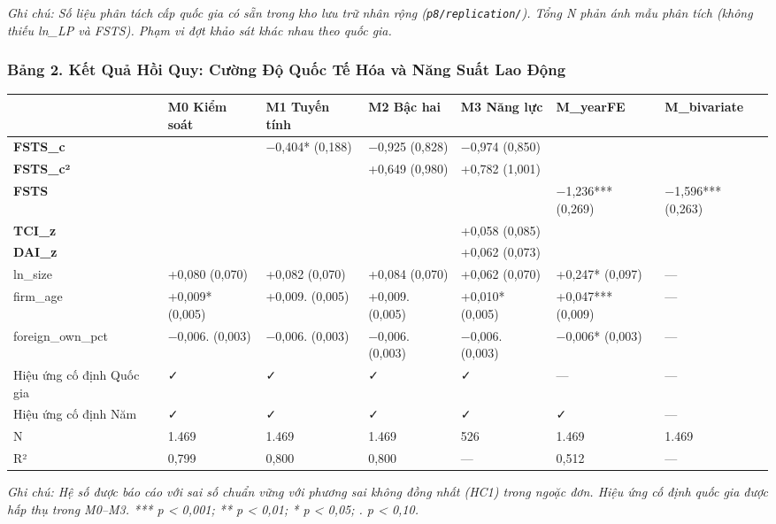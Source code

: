 \documentclass[12pt,a4paper]{article}
\begin{document}
\emph{Ghi chú: Số liệu phân tách cấp quốc gia có sẵn trong kho lưu trữ
nhân rộng (\texttt{p8/replication/}). Tổng N phản ánh mẫu phân tích
(không thiếu ln\_LP và FSTS). Phạm vi đợt khảo sát khác nhau theo quốc
gia.}

\hypertarget{bux1ea3ng-2-kux1ebft-quux1ea3-hux1ed3i-quy-cux1b0ux1eddng-ux111ux1ed9-quux1ed1c-tux1ebf-huxf3a-vuxe0-nux103ng-suux1ea5t-lao-ux111ux1ed9ng}{%
\subsubsection{Bảng 2. Kết Quả Hồi Quy: Cường Độ Quốc Tế Hóa và Năng
Suất Lao
Động}\label{bux1ea3ng-2-kux1ebft-quux1ea3-hux1ed3i-quy-cux1b0ux1eddng-ux111ux1ed9-quux1ed1c-tux1ebf-huxf3a-vuxe0-nux103ng-suux1ea5t-lao-ux111ux1ed9ng}}

\begin{longtable}[]{@{}lllllll@{}}
\toprule\noalign{}
& M0 Kiểm soát & M1 Tuyến tính & M2 Bậc hai & M3 Năng lực & M\_yearFE &
M\_bivariate \\
\midrule\noalign{}
\endhead
\bottomrule\noalign{}
\endlastfoot
\textbf{FSTS\_c} & & −0,404* (0,188) & −0,925 (0,828) & −0,974 (0,850) &
& \\
\textbf{FSTS\_c²} & & & +0,649 (0,980) & +0,782 (1,001) & & \\
\textbf{FSTS} & & & & & −1,236*** (0,269) & −1,596*** (0,263) \\
\textbf{TCI\_z} & & & & +0,058 (0,085) & & \\
\textbf{DAI\_z} & & & & +0,062 (0,073) & & \\
ln\_size & +0,080 (0,070) & +0,082 (0,070) & +0,084 (0,070) & +0,062
(0,070) & +0,247* (0,097) & --- \\
firm\_age & +0,009* (0,005) & +0,009. (0,005) & +0,009. (0,005) &
+0,010* (0,005) & +0,047*** (0,009) & --- \\
foreign\_own\_pct & −0,006. (0,003) & −0,006. (0,003) & −0,006. (0,003)
& −0,006. (0,003) & −0,006* (0,003) & --- \\
Hiệu ứng cố định Quốc gia & ✓ & ✓ & ✓ & ✓ & --- & --- \\
Hiệu ứng cố định Năm & ✓ & ✓ & ✓ & ✓ & ✓ & --- \\
N & 1.469 & 1.469 & 1.469 & 526 & 1.469 & 1.469 \\
R² & 0,799 & 0,800 & 0,800 & --- & 0,512 & --- \\
\end{longtable}

\emph{Ghi chú: Hệ số được báo cáo với sai số chuẩn vững với phương sai
không đồng nhất (HC1) trong ngoặc đơn. Hiệu ứng cố định quốc gia được
hấp thụ trong M0--M3. *** p \textless{} 0,001; ** p \textless{} 0,01; *
p \textless{} 0,05; . p \textless{} 0,10.}
\end{document}
